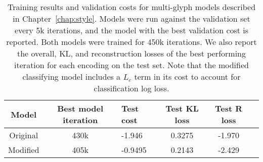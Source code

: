\begin{table}[h!]
\centering
    \caption[Training results for the multi-class digit glyph models]{Training results and validation costs for multi-glyph models described in Chapter~\ref{chap:style}.
    Models were run against the validation set every 5k iterations, and the model with the best validation cost is reported.
    Both models were trained for 450k iterations.
    We also report the overall, KL, and reconstruction losses of the best performing iteration for each encoding on the test set.
    Note that the modified classifying model includes a $L_c$ term in its cost to account for classification log loss.
    \label{apptbl:train-style}}
\begin{tabularx}{\textwidth}{c c X c c c}
\toprule
    Model & Best model iteration & Test cost & Test KL loss & Test R loss \\ \midrule
    Original & 430k & -1.946 & 0.3275 & -1.970 \\
    Modified & 405k & -0.9495 & 0.2143 & -2.429 \\
\end{tabularx}
\end{table}

